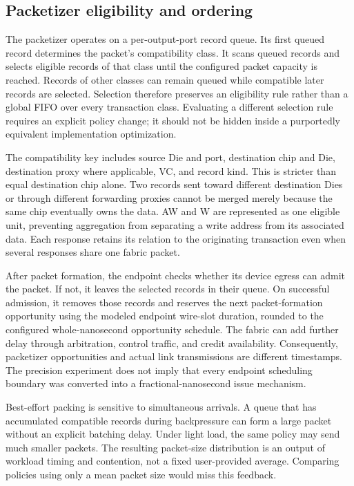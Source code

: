 \subsection{Packetizer eligibility and ordering}
The packetizer operates on a per-output-port record queue. Its first queued record determines the packet's compatibility class. It scans queued records and selects eligible records of that class until the configured packet capacity is reached. Records of other classes can remain queued while compatible later records are selected. Selection therefore preserves an eligibility rule rather than a global FIFO over every transaction class. Evaluating a different selection rule requires an explicit policy change; it should not be hidden inside a purportedly equivalent implementation optimization.

The compatibility key includes source Die and port, destination chip and Die, destination proxy where applicable, VC, and record kind. This is stricter than equal destination chip alone. Two records sent toward different destination Dies or through different forwarding proxies cannot be merged merely because the same chip eventually owns the data. AW and W are represented as one eligible unit, preventing aggregation from separating a write address from its associated data. Each response retains its relation to the originating transaction even when several responses share one fabric packet.

After packet formation, the endpoint checks whether its device egress can admit the packet. If not, it leaves the selected records in their queue. On successful admission, it removes those records and reserves the next packet-formation opportunity using the modeled endpoint wire-slot duration, rounded to the configured whole-nanosecond opportunity schedule. The fabric can add further delay through arbitration, control traffic, and credit availability. Consequently, packetizer opportunities and actual link transmissions are different timestamps. The precision experiment does not imply that every endpoint scheduling boundary was converted into a fractional-nanosecond issue mechanism.

Best-effort packing is sensitive to simultaneous arrivals. A queue that has accumulated compatible records during backpressure can form a large packet without an explicit batching delay. Under light load, the same policy may send much smaller packets. The resulting packet-size distribution is an output of workload timing and contention, not a fixed user-provided average. Comparing policies using only a mean packet size would miss this feedback.

